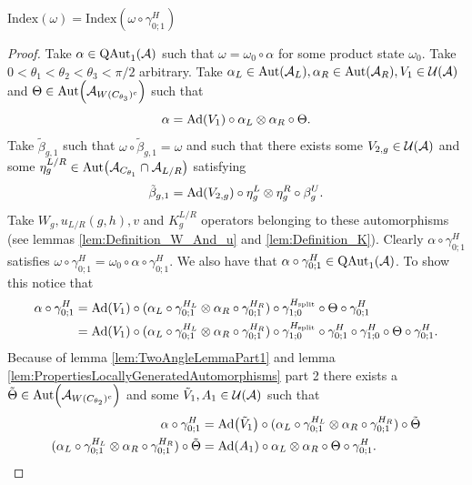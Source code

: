 \documentclass[12pt,a4paper,twoside]{article}
\numberwithin{equation}{section}
\begin{document}
\begin{theorem}\label{thrm:IndexInvariantUnderLGA}
	$\textrm{Index}(\omega)=\textrm{Index}(\omega\circ\gamma^H_{0;1})$
\end{theorem}
\begin{proof}
	Take $\alpha\in\QAut{\AA}$ such that $\omega=\omega_0\circ\alpha$ for some product state $\omega_0$. Take $0<\theta_1<\theta_2<\theta_3<\pi/2$ arbitrary. Take $\alpha_L\in\Aut{\AA_L},\alpha_R\in\Aut{\AA_R},V_1\in\UU(\AA)$ and $\Theta\in\Aut{\AA_{W(C_{\theta_3})^c}}$ such that
	\begin{equation}
		\alpha=\Ad{V_1}\circ\alpha_L\otimes\alpha_R\circ\Theta.
	\end{equation}
	Take $\tilde{\beta}_{g,1}$ such that $\omega\circ\tilde{\beta}_{g,1}=\omega$ and such that there exists some $V_{2,g}\in\mathcal U(\mathcal A)$ and some $\eta_g^{L/R}\in\Aut{\AA_{C_{\theta_1}}\cap\AA_{L/R}}$ satisfying
	\begin{equation}
		\tilde{\beta}_{g,1}=\Ad{V_{2,g}}\circ\eta_{g}^L\otimes\eta_{g}^R\circ\beta_g^U.
	\end{equation}
	Take $W_g,u_{L/R}(g,h),v$ and $K_g^{L/R}$ operators belonging to these automorphisms (see lemmas \ref{lem:Definition_W_And_u} and \ref{lem:Definition_K}). Clearly $\alpha\circ\gamma^H_{0;1}$ satisfies $\omega\circ\gamma^{H}_{0;1}=\omega_0\circ\alpha\circ\gamma^{H}_{0;1}$. We also have that $\alpha\circ\gamma^{H}_{0;1}\in\QAut{\AA}$. To show this notice that
	\begin{align}
		\alpha\circ\gamma^{H}_{0;1}&=\Ad{V_1}\circ(\alpha_L\circ\gamma^{H_L}_{0;1}\otimes\alpha_R\circ\gamma^{H_R}_{0;1})\circ\gamma^{H_\text{split}}_{1;0}\circ\Theta\circ\gamma^H_{0;1}\\
		&=\Ad{V_1}\circ(\alpha_L\circ\gamma^{H_L}_{0;1}\otimes\alpha_R\circ\gamma^{H_R}_{0;1})\circ\gamma^{H_\text{split}}_{1;0}\circ\gamma^{H}_{0;1}\circ\gamma^{H}_{1;0}\circ\Theta\circ\gamma^H_{0;1}.
	\end{align}
	Because of lemma \ref{lem:TwoAngleLemmaPart1} and lemma \ref{lem:PropertiesLocallyGeneratedAutomorphisms} part 2 there exists a $\tilde{\Theta}\in\Aut{\AA_{W(C_{\theta_2})^c}}$ and some $\tilde V_1,A_1\in\mathcal U(\mathcal A)$ such that
	\begin{align}
		\alpha\circ\gamma^H_{0;1}&=\Ad{\tilde V_1}\circ(\alpha_L\circ\gamma^{H_L}_{0;1}\otimes\alpha_R\circ\gamma^{H_R}_{0;1})\circ\tilde\Theta\\
		\label{eq:ProofThatTheH2IndexIsInvariantUnderLGA's_Definition_A1}
		(\alpha_L\circ\gamma^{H_L}_{0;1}\otimes\alpha_R\circ\gamma^{H_R}_{0;1})\circ\tilde\Theta&=\Ad{A_1}\circ \alpha_L\otimes\alpha_R\circ\Theta\circ\gamma^{H}_{0;1}.

\end{align}
\end{proof}
\end{document}
